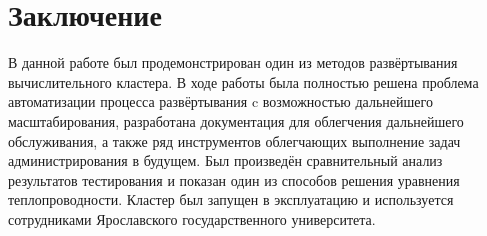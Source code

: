 \documentclass[a4paper]{extarticle}
\begin{document}
\newpage

\section*{Заключение}
В данной работе был продемонстрирован один из методов развёртывания вычислительного кластера.
В ходе работы была полностью решена проблема автоматизации процесса развёртывания c возможностью дальнейшего масштабирования, разработана документация для облегчения дальнейшего обслуживания, а  также ряд инструментов облегчающих выполнение задач администрирования в будущем.  Был произведён сравнительный анализ результатов тестирования и показан один из способов решения уравнения теплопроводности. Кластер был запущен в эксплуатацию и используется сотрудниками Ярославского государственного университета.

\newpage

\fontsize{12}{12}\selectfont
\end{document}
